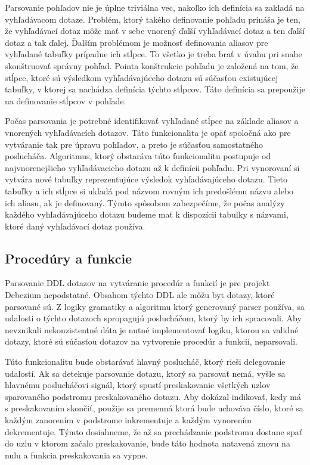 Parsovanie pohľadov nie je úplne triviálna vec, nakoľko ich definícia sa zakladá na vyhľadávacom dotaze. Problém, ktorý takého definovanie pohľadu prináša je ten, že vyhľadávací dotaz môže mať v sebe vnorený ďalší vyhľadávací dotaz a ten ďalší dotaz a tak ďalej. Ďalším problémom je možnosť definovania aliasov pre vyhľadané tabuľky prípadne ich stĺpce. To všetko je treba brať v úvahu pri snahe skonštruovať správny pohľad. Pointa konštrukcie pohľadu je založená na tom, že stĺpce, ktoré sú výsledkom vyhľadávajúceho dotazu sú súčasťou existujúcej tabuľky, v ktorej sa nachádza definícia týchto stĺpcov. Táto definícia sa prepoužije na definovanie stĺpcov v pohľade. 

Počas parsovania je potrebné identifikovať vyhľadané stĺpce na základe aliasov a vnorených vyhľadávacích dotazov. Táto funkcionalita je opäť spoločná ako pre vytváranie tak pre úpravu pohľadov, a preto je súčasťou samostatného poslucháča. Algoritmus, ktorý obstaráva túto funkcionalitu postupuje od najvnorenejšieho vyhľadávacieho dotazu až k definícii pohľadu. Pri vynorovaní si vytvára nové tabuľky reprezentujúce výsledok vyhľadávajúceho dotazu. Tieto tabuľky a ich stĺpce si ukladá pod názvom rovným ich predošlému názvu alebo ich aliasu, ak je definovaný. Týmto spôsobom zabezpečíme, že počas analýzy každého vyhľadávajúceho dotazu budeme mať k dispozícii tabuľky s názvami, ktoré daný vyhľadávací dotaz používa.

\subsection{Procedúry a funkcie}
Parsovanie DDL dotazov na vytváranie procedúr a funkcií je pre projekt Debezium nepodstatné. Obsahom týchto DDL ale môžu byt dotazy, ktoré parsované sú. Z logiky gramatiky a algoritmu ktorý generovaný parser používa, sa udalosti o týchto dotazoch spropagujú poslucháčom, ktorý by ich spracovali. Aby nevznikali nekonzistentné dáta je nutné implementovať logiku, ktorou sa validné dotazy, ktoré sú súčasťou dotazov na vytvorenie procedúr a funkcií, neparsovali.

Túto funkcionalitu bude obstarávať hlavný poslucháč, ktorý rieši delegovanie udalostí. Ak sa detekuje parsovanie dotazu, ktorý sa parsovať nemá, vyšle sa hlavnému poslucháčovi signál, ktorý spustí preskakovanie všetkých uzlov sparovaného podstromu preskakovaného dotazu. Aby dokázal indikovať, kedy má s preskakovaním skončiť, použije sa premenná ktorá bude uchováva číslo, ktoré sa každým zanorením v podstrome inkrementuje a každým vynorením dekrementuje. Týmto dosiahneme, že až sa prechádzanie podstromu dostane spať do uzlu v ktorom začalo preskakovanie, bude táto hodnota natavená znovu na nulu a funkcia preskakovania sa vypne.

